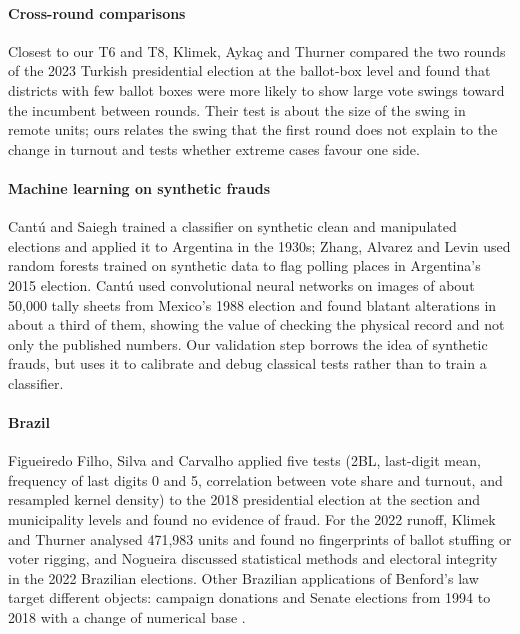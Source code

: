 \documentclass[fleqn,10pt]{SelfArx}
\begin{document}
\paragraph{Cross-round comparisons} Closest to our T6 and T8, Klimek, Ayka\c{c}
and Thurner \cite{klimek2023} compared the two rounds of the 2023 Turkish
presidential election at the ballot-box level and found that districts with
few ballot boxes were more likely to show large vote swings toward the
incumbent between rounds. Their test is about the size of the swing in
remote units; ours relates the swing that the first round does not explain
to the change in turnout and tests whether extreme cases favour one side.

\paragraph{Machine learning on synthetic frauds} Cant\'u and Saiegh
\cite{cantu2011} trained a classifier on synthetic clean and manipulated
elections and applied it to Argentina in the 1930s; Zhang, Alvarez and Levin
\cite{zhang2019} used random forests trained on synthetic data to flag
polling places in Argentina's 2015 election. Cant\'u \cite{cantu2019} used
convolutional neural networks on images of about 50,000 tally sheets from
Mexico's 1988 election and found blatant alterations in about a third of
them, showing the value of checking the physical record and not only the
published numbers. Our validation step borrows the idea of synthetic frauds,
but uses it to calibrate and debug classical tests rather than to train a
classifier.

\paragraph{Brazil} Figueiredo Filho, Silva and Carvalho
\cite{figueiredo2022} applied five tests (2BL, last-digit mean, frequency of
last digits 0 and 5, correlation between vote share and turnout, and
resampled kernel density) to the 2018 presidential election at the section
and municipality levels and found no evidence of fraud. For the 2022
runoff, Klimek and Thurner \cite{csh2022} analysed 471,983 units and found
no fingerprints of ballot stuffing or voter rigging, and Nogueira
\cite{nogueira2024} discussed statistical methods and electoral integrity in
the 2022 Brazilian elections. Other Brazilian applications of Benford's law
target different objects: campaign donations \cite{gamermann2018} and
Senate elections from 1994 to 2018 with a change of numerical base
\cite{gueron2022}.
\end{document}
